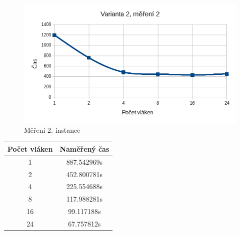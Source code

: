 \documentclass[12pt]{article}
\begin{document}
\begin{figure}
  \begin{center}
    \includegraphics[width=12cm]{images/sse2.png}
    \caption{Měření 2. instance} 
  \end{center}
\end{figure}
%
%
\begin{center}
\begin{tabular}{ c | c }
\textbf{Počet vláken} & \textbf{Naměřený čas} \\ \hline \hline 
1 & 887.542969s \\ \hline
2 & 452.800781s \\ \hline
4 & 225.554688s \\ \hline
8 & 117.988281s \\ \hline
16 & 99.117188s \\ \hline
24 & 67.757812s \\ \hline
\end{tabular}
\end{center}
\end{document}
